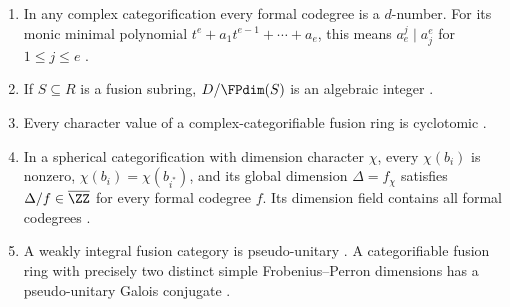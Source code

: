 \begin{proposition}\label{finite:prop:standard}
\begin{enumerate}
\item In any complex categorification every formal codegree is a
$d$-number. For its monic minimal polynomial
$t^e+a_1t^{e-1}+\cdots+a_e$, this means
$a_e^j\mid a_j^e$ for $1\leq j\leq e$
\cite{OstrikCodegrees}.
\item If $S\subseteq R$ is a fusion subring, $D/\FPdim(S)$ is an
algebraic integer \cite[Theorem 7.17.6]{EGNO}.
\item Every character value of a complex-categorifiable fusion ring is
cyclotomic \cite[Theorem 8.51 and Corollary 8.53]{ENO}.
\item In a spherical categorification with dimension character $\chi$,
every $\chi(b_i)$ is nonzero, $\chi(b_i)=\chi(b_{i^*})$, and its global
dimension $\Delta=f_\chi$ satisfies $\Delta/f\in\overline{\ZZ}$
for every formal codegree $f$. Its dimension field contains all formal
codegrees \cite[Theorem 2.13 and Corollaries 2.14--2.15]{Ostrik3}.
\item A weakly integral fusion category is pseudo-unitary
\cite[Proposition 8.24]{ENO}. A categorifiable fusion ring with precisely
two distinct simple Frobenius--Perron dimensions has a pseudo-unitary
Galois conjugate \cite[Lemma 3.1]{Schopieray}.
\end{enumerate}
\end{proposition}

